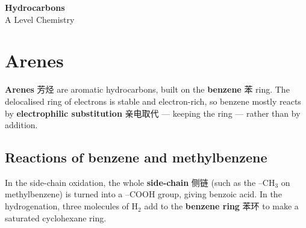 \documentclass[11pt]{article}
\begin{document}
\begin{center}
  {\LARGE\bfseries Hydrocarbons}\\[0.35em]
  {\large A Level Chemistry}
\end{center}
\vspace{0.6em}

\section*{Arenes}

\textbf{Arenes} 芳烃 are aromatic hydrocarbons, built on the \textbf{benzene} 苯 ring. The delocalised ring of electrons is stable and electron-rich, so benzene mostly reacts by \textbf{electrophilic substitution} 亲电取代 — keeping the ring — rather than by addition.

\subsection*{Reactions of benzene and methylbenzene}

\begin{center}
\end{center}

In the side-chain oxidation, the whole \textbf{side-chain} 侧链 (such as the $\text{–CH}_3$ on methylbenzene) is turned into a $\text{–COOH}$ group, giving benzoic acid. In the hydrogenation, three molecules of $\text{H}_2$ add to the \textbf{benzene ring} 苯环 to make a saturated cyclohexane ring.
\end{document}
